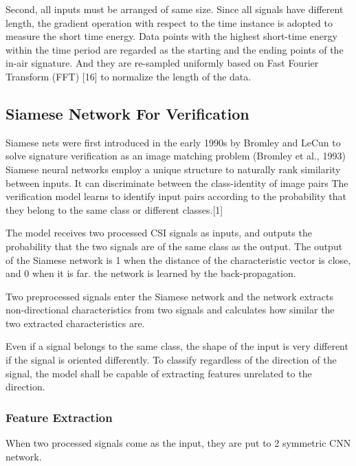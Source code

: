 \documentclass[runningheads]{llncs}
\begin{document}
Second, all inputs must be arranged of same size.
Since all signals have different length, the gradient operation with respect to the time instance is adopted to measure the short time energy. 
Data points with the highest short-time energy within the time period are regarded as the starting and the ending points of the in-air signature.
And they are re-sampled uniformly based on Fast Fourier Transform (FFT) [16] to normalize the length of the data. 


\subsection{Siamese Network For Verification}

Siamese nets were first introduced in the early 1990s by Bromley and LeCun to solve signature verification as an image matching problem (Bromley et al., 1993)
Siamese neural networks employ a unique structure to naturally rank similarity between inputs.
It can discriminate between the class-identity of image pairs
The verification model learns to identify input pairs according to the probability that they belong to the same class or different classes.[1]

The model receives two processed CSI signals as inputs, and outputs the probability that the two signals are of the same class as the output. 
The output of the Siamese network is 1 when the distance of the characteristic vector is close, and 0 when it is far.
the network is learned by the back-propagation.

Two preprocessed signals enter the Siamese network and the network extracts non-directional characteristics from two signals and calculates how similar the two extracted characteristics are.

Even if a signal belongs to the same class, the shape of the input is very different if the signal is oriented differently.
To classify regardless of the direction of the signal, the model shall be capable of extracting features unrelated to the direction.


\subsubsection{Feature Extraction}
When two processed signals come as the input, they are put to 2 symmetric CNN network.
\end{document}
